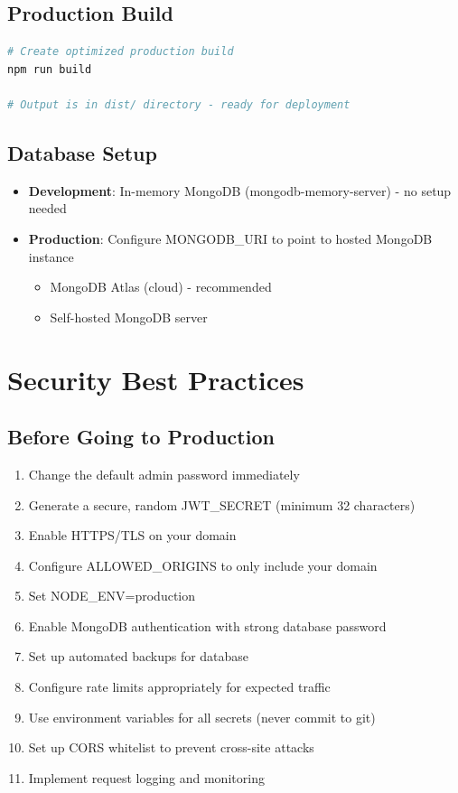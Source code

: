 \documentclass[12pt]{article}
\begin{document}
\subsection{Production Build}

\begin{lstlisting}[language=bash]
# Create optimized production build
npm run build

# Output is in dist/ directory - ready for deployment
\end{lstlisting}

\subsection{Database Setup}

\begin{itemize}
  \item \textbf{Development}: In-memory MongoDB (mongodb-memory-server) - no setup needed
  \item \textbf{Production}: Configure MONGODB\_URI to point to hosted MongoDB instance
    \begin{itemize}
      \item MongoDB Atlas (cloud) - recommended
      \item Self-hosted MongoDB server
    \end{itemize}
\end{itemize}

\section{Security Best Practices}

\subsection{Before Going to Production}

\begin{enumerate}
  \item Change the default admin password immediately
  \item Generate a secure, random JWT\_SECRET (minimum 32 characters)
  \item Enable HTTPS/TLS on your domain
  \item Configure ALLOWED\_ORIGINS to only include your domain
  \item Set NODE\_ENV=production
  \item Enable MongoDB authentication with strong database password
  \item Set up automated backups for database
  \item Configure rate limits appropriately for expected traffic
  \item Use environment variables for all secrets (never commit to git)
  \item Set up CORS whitelist to prevent cross-site attacks
  \item Implement request logging and monitoring
\end{enumerate}
\end{document}
